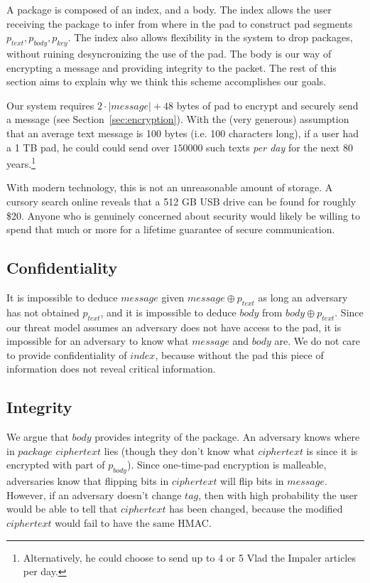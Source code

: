 \documentclass[twocolumn]{article}
\begin{document}
A package is composed of an index, and a body. The index allows the user receiving the package to infer from where in the pad to construct pad segments $p_{text}, p_{body}, p_{key}$. The index also allows flexibility in the system to drop packages, without ruining desyncronizing the use of the pad. The body is our way of encrypting a message and providing integrity to the packet. The rest of this section aims to explain why we think this scheme accomplishes our goals.  

Our system requires $2\cdot |message| + 48$ bytes of pad to encrypt and securely send a message (see Section~\ref{sec:encryption}). With the (very generous) assumption that an average text message is 100 bytes (i.e. 100 characters long), if a user had a 1 TB pad, he could could send over $150000$ such texts \emph{per day} for the next 80 years.\footnote{
Alternatively, he could choose to send up to 4 or 5 Vlad the Impaler articles per day.
}

With modern technology, this is not an unreasonable amount of storage. A cursory search online reveals that a 512 GB USB drive can be found for roughly \$20. Anyone who is genuinely concerned about security would likely be willing to spend that much or more for a lifetime guarantee of secure communication.

\subsection{Confidentiality}
It is impossible to deduce $message$ given $message \oplus p_{text}$
as long an adversary has not obtained $p_{text}$, and it is impossible to deduce $body$ from $body \oplus p_{text}$. Since our threat model assumes an adversary does not have access to the pad, it is impossible for an adversary to know what $message$ and $body$ are. We do not care to provide confidentiality of $index$, because without the pad this piece of information does not reveal critical information. 

\subsection{Integrity}
We argue that $body$ provides integrity of the package. An adversary knows where in $package$ $ciphertext$ lies (though they don't know what $ciphertext$ is since it is encrypted with part of $p_{body}$). Since one-time-pad encryption is malleable, adversaries know that flipping bits in $ciphertext$ will flip bits in $message$. However, if an adversary doesn't change $tag$, then with high probability the user would be able to tell that $ciphertext$ has been changed, because the modified $ciphertext$ would fail to have the same HMAC.
\end{document}
